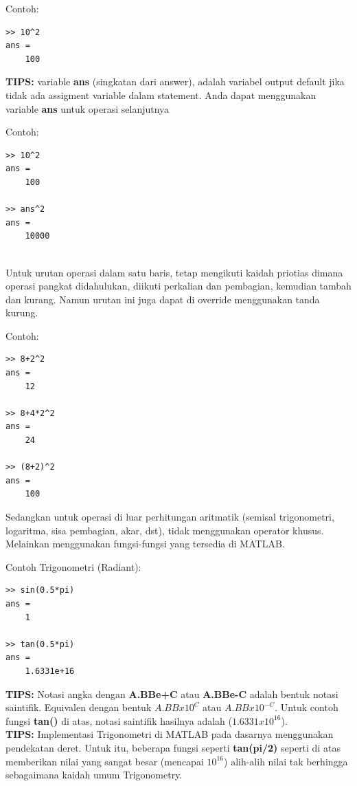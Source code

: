 \documentclass[12pt]{book}
\begin{document}
	Contoh:
	\begin{verbatim}
>> 10^2
ans = 
    100
	\end{verbatim}
	
	\textbf{TIPS:} variable \textbf{ans} (singkatan dari answer), adalah variabel output default jika tidak ada assigment variable dalam statement.
	Anda dapat menggunakan variable \textbf{ans} untuk operasi selanjutnya
	
	Contoh:
	\begin{verbatim}
>> 10^2
ans = 
    100
	
>> ans^2
ans = 
    10000
	\end{verbatim}
	\\
	
	Untuk urutan operasi dalam satu baris, tetap mengikuti kaidah priotias dimana operasi pangkat didahulukan, diikuti perkalian dan pembagian, kemudian tambah dan kurang.
	Namun urutan ini juga dapat di override menggunakan tanda kurung.
	
	Contoh:
	\begin{verbatim}
>> 8+2^2
ans = 
    12

>> 8+4*2^2
ans = 
    24
	
>> (8+2)^2
ans =
    100
	\end{verbatim}

	Sedangkan untuk operasi di luar perhitungan aritmatik (semisal trigonometri, logaritma, sisa pembagian, akar, dst), tidak menggunakan operator khusus.
	Melainkan menggunakan fungsi-fungsi yang tersedia di MATLAB.
	
	Contoh Trigonometri (Radiant):
	\begin{verbatim}
>> sin(0.5*pi)
ans = 
    1
    
>> tan(0.5*pi)
ans = 
    1.6331e+16
	\end{verbatim}

	\textbf{TIPS:} Notasi angka dengan \textbf{A.BBe+C} atau \textbf{A.BBe-C} adalah bentuk notasi saintifik.
	Equivalen dengan bentuk $A.BB x 10^C$ atau $A.BB x 10^{-C}$.
	Untuk contoh fungsi \textbf{tan()} di atas, notasi saintifik hasilnya adalah (\textbf{$1.6331x10^{16}$}).\\

	\textbf{TIPS:} Implementasi Trigonometri di MATLAB pada dasarnya menggunakan pendekatan deret.
	Untuk itu, beberapa fungsi seperti \textbf{tan(pi/2)} seperti di atas memberikan nilai yang sangat besar (mencapai $10^{16}$)
	alih-alih nilai tak berhingga sebagaimana kaidah umum Trigonometry.
	
\end{document}
